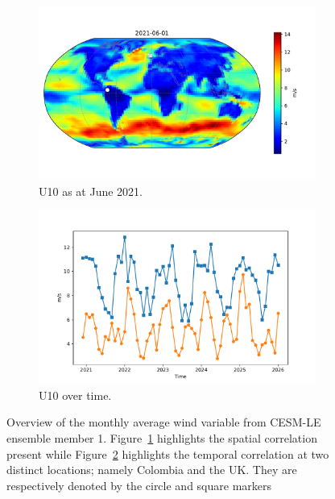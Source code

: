 \begin{figure}[htbp!] 
	\centering
	\begin{subfigure}[b]{0.45\textwidth}
		\includegraphics[width=\textwidth]{U10_example}
		\caption{U10 as at June 2021.}
		\label{fig:wind_june}   
	\end{subfigure}             
	\begin{subfigure}[b]{0.45\textwidth}
		\includegraphics[width=\textwidth]{U10_example_temp}
		\caption{U10 over time.}
		\label{fig:wind_temp}
	\end{subfigure}             
	\caption[Overview of Wind variable]{Overview of the monthly average wind variable from CESM-LE ensemble member 1. Figure~\ref{fig:wind_june} highlights the spatial correlation present while Figure~\ref{fig:wind_temp} highlights the temporal correlation at two distinct locations; namely Colombia and the UK. They are respectively denoted by the circle and square markers}
	\label{fig:wind_overview}
\end{figure}

